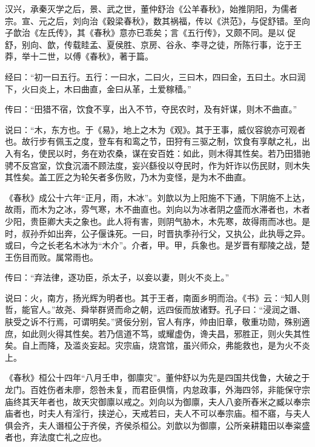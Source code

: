 \documentclass[12pt,UTF8]{ctexbook}
\begin{document}
汉兴，承秦灭学之后，景、武之世，董仲舒治《公羊春秋》，始推阴阳，为儒者宗。宣、元之后，刘向治《穀梁春秋》，数其祸福，传以《洪范》，与促舒错。至向子歆治《左氏传》，其《春秋》意亦已乖矣；言《五行传》，又颇不同。是以促舒，别向、歆，传载眭孟、夏侯胜、京房、谷永、李寻之徒，所陈行事，讫于王莽，举十二世，以傅《春秋》，著于篇。



经曰：“初一曰五行。五行：一曰水，二曰火，三曰木，四曰金，五曰土。水曰润下，火曰炎上，木曰曲直，金曰从革，土爱稼穑。”



传曰：“田猎不宿，饮食不享，出入不节，夺民农时，及有奸谋，则木不曲直。”



说曰：“木，东方也。于《易》，地上之木为《观》。其于王事，威仪容貌亦可观者也。故行步有佩玉之度，登车有和鸾之节，田狩有三驱之制，饮食有享献之礼，出入有名，使民以时，务在劝农桑，谋在安百姓：如此，则木得其性矣。若乃田猎驰骋不反宫室，饮食沉湎不顾法度，妄兴繇役以夺民时，作为奸诈以伤民财，则木失其性矣。盖工匠之为轮矢者多伤败，乃木为变怪，是为木不曲直。



《春秋》成公十六年“正月，雨，木冰”。刘歆以为上阳施不下通，下阴施不上达，故雨，而木为之冰，雰气寒，木不曲直也。刘向以为冰者阴之盛而水滞者也，木者少阳，贵臣卿大夫之象也。此人将有害，则阴气胁木，木先寒，故得雨而冰也。是时，叔孙乔如出奔，公子偃诛死。一曰，时晋执季孙行父，又执公，此执辱之异。或曰，今之长老名木冰为“木介”。介者，甲。甲，兵象也。是岁晋有鄢陵之战，楚王伤目而败。属常雨也。



传曰：“弃法律，逐功臣，杀太子，以妾以妻，则火不炎上。”



说曰：火，南方，扬光辉为明者也。其于王者，南面乡明而治。《书》云：“知人则哲，能官人。”故尧、舜举群贤而命之朝，远四佞而放诸野。孔子曰：“浸润之谮、肤受之诉不行焉，可谓明矣。”贤佞分别，官人有序，帅由旧章，敬重功勋，殊别適庶，如此则火得其性矣。若乃信道不笃，或耀虚伪，谗夫昌，邪胜正，则火失其性矣。自上而降，及滥炎妄起。灾宗庙，烧宫馆，虽兴师众，弗能救也，是为火不炎上。



《春秋》桓公十四年“八月壬申，御廪灾”。董仲舒以为先是四国共伐鲁，大破之于龙门。百姓伤者未廖，怨咎未复，而君臣俱惰，内怠政事，外海四邻，非能保守宗庙终其天年者也，故天灾御廪以戒之。刘向以为御廪，夫人八妾所舂米之臧以奉宗庙者也，时夫人有淫行，挟逆心，天戒若曰，夫人不可以奉宗庙。桓不寤，与夫人俱会齐，夫人谮桓公于齐侯，齐侯杀桓公。刘歆以为御廪，公所亲耕籍田以奉粢盛者也，弃法度亡礼之应也。
\end{document}
